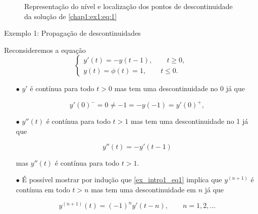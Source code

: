 \documentclass{beamer}
\theoremstyle{plain}
\theoremstyle{definition}
\begin{document}
\begin{frame}
\begin{figure}[H]
\begin{center}
\begin{adjustbox}{max width=\textwidth}
                 \end{adjustbox}
             \end{center}
             \caption{\footnotesize Representação do nível e localização dos pontos de descontinuidade da solução de  \eqref{chap1:ex1:eq:1}}
             \label{chap1:ex1:fig:1}
         \end{figure}



     
\end{frame}



\begin{frame}{Exemplo 1: Propagação de descontinuidades}

    \scriptsize
        Reconsideremos a equação
        \begin{equation}
            \begin{cases}
                y'(t) = -y(t - 1), \qquad t \geq 0, \\
                y(t) = \phi(t) = 1, \qquad t \leq 0.
            \end{cases} 
        \end{equation}


        \begin{itemize}
            \item[$\bullet$] $y'$ é contínua para todo $t > 0$ mas tem uma descontinuidade no 0 já que

                \[
                    y'(0)^- = 0 \neq -1 = -y(-1) = y'(0)^+,
                \]
    


            \item[$\bullet$] $y''(t)$ é contínua para todo $t>1$ mas tem uma descontinuidade no 1 já que 

                \begin{equation}
                    y''(t) = - y'(t - 1)
                    \label{ex_intro1_eq1}
                \end{equation}

                mas $y''(t)$ é contínua para todo $t > 1$.


            \item[$\bullet$] É possível mostrar por indução que \eqref{ex_intro1_eq1} implica que $y^{(n+1)}$ é contínua em todo $t>n$ mas tem uma descontinuidade em $n$ já que

                \[
                    y^{(n+1)}(t) = (-1)^n y'(t - n), \qquad n = 1,2, ...
                \]


        \end{itemize}

\end{frame}
\end{document}
